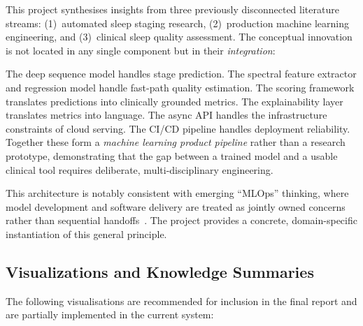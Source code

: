 \documentclass[10pt]{article}
\begin{document}
This project synthesises insights from three previously disconnected literature streams: (1)~automated sleep staging research, (2)~production machine learning engineering, and (3)~clinical sleep quality assessment. The conceptual innovation is not located in any single component but in their \textit{integration}:

The deep sequence model handles stage prediction. The spectral feature extractor and regression model handle fast-path quality estimation. The scoring framework translates predictions into clinically grounded metrics. The explainability layer translates metrics into language. The async API handles the infrastructure constraints of cloud serving. The CI/CD pipeline handles deployment reliability. Together these form a \textit{machine learning product pipeline} rather than a research prototype, demonstrating that the gap between a trained model and a usable clinical tool requires deliberate, multi-disciplinary engineering.

This architecture is notably consistent with emerging ``MLOps'' thinking, where model development and software delivery are treated as jointly owned concerns rather than sequential handoffs~\cite{sculley2015hidden}. The project provides a concrete, domain-specific instantiation of this general principle.

\subsection{Visualizations and Knowledge Summaries}
\label{sec:visuals}

The following visualisations are recommended for inclusion in the final report and are partially implemented in the current system:
\end{document}
